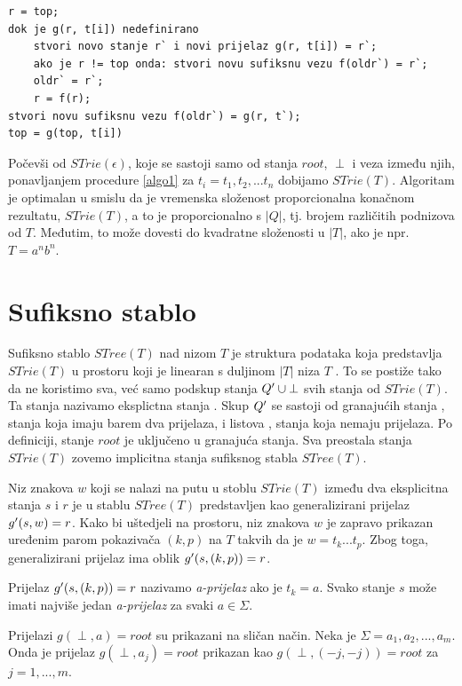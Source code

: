 \documentclass[times, utf8, seminar, numeric]{fer}
\begin{document}
\begin{lstlisting}[caption=Izgradnja $STrie(T^i)$ iz $STrie(T^{i-1})$, label=algo1]
r = top;
dok je g(r, t[i]) nedefinirano
	stvori novo stanje r` i novi prijelaz g(r, t[i]) = r`;
	ako je r != top onda: stvori novu sufiksnu vezu f(oldr`) = r`;
	oldr` = r`;
	r = f(r);
stvori novu sufiksnu vezu f(oldr`) = g(r, t`);
top = g(top, t[i])
\end{lstlisting}
	
	Počevši od $STrie(\epsilon)$, koje se sastoji samo od stanja $root$, $\perp$ i veza između njih, ponavljanjem procedure \ref{algo1} za $t_i = t_1,t_2,...t_n$ dobijamo $STrie(T)$. Algoritam je optimalan u smislu da je vremenska složenost proporcionalna konačnom rezultatu, $STrie(T)$, a to je proporcionalno s $|Q|$, tj. brojem različitih podnizova od $T$. Međutim, to može dovesti do kvadratne složenosti u $|T|$, ako je npr. $T=a^n b^n$.

\section{Sufiksno stablo}
	Sufiksno stablo $STree(T)$ nad nizom $T$ je struktura podataka koja predstavlja $STrie(T)$ u prostoru koji je linearan s duljinom $|T|$ niza $T$ \cite{ukkonen}. To se postiže tako da ne koristimo sva, već samo podskup stanja $Q\rq{} \cup {\perp}$ svih stanja od $STrie(T)$. Ta stanja nazivamo eksplictna stanja . Skup $Q\rq{}$ se sastoji od granajućih stanja , stanja koja imaju barem dva prijelaza, i listova , stanja koja nemaju prijelaza. Po definiciji, stanje $root$ je uključeno u granajuća stanja. Sva preostala stanja $STrie(T)$ zovemo implicitna stanja  sufiksnog stabla $STree(T)$.
	
	Niz znakova $w$ koji se nalazi na putu u stoblu $STrie(T)$ između dva eksplicitna stanja $s$ i $r$ je u stablu $STree(T)$ predstavljen kao generalizirani prijelaz $g\rq{}(s, w) = r$. Kako bi uštedjeli na prostoru, niz znakova $w$ je zapravo prikazan uređenim parom pokazivača $(k, p)$ na $T$ takvih da je $w = t_k ... t_p$. Zbog toga, generalizirani prijelaz ima oblik $g\rq{}(s,(k, p)) = r$.
	
	Prijelaz $g\rq{}(s, (k, p)) = r$ nazivamo \textit{a-prijelaz} ako je $t_k = a$. Svako stanje $s$ može imati najviše jedan \textit{a-prijelaz} za svaki $a \in \Sigma$.
	
	Prijelazi $g(\perp, a) = root$ su prikazani na sličan način. Neka je $\Sigma = {a_1, a_2, ..., a_m}$. Onda je prijelaz $g(\perp, a_j) = root$ prikazan kao $g(\perp, (-j, -j)) = root$ za $j = 1, ... , m$.
	
\end{document}

